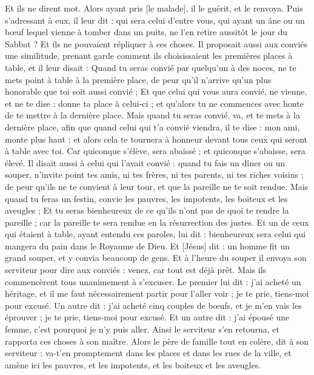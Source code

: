 \begin{multicols}{2}
Et ils ne dirent mot. Alors ayant pris [le malade], il le guérit, et le renvoya.
Puis s'adressant à eux, il leur dit : qui sera celui d'entre vous, qui ayant un âne ou un bœuf lequel vienne à tomber dans un puits, ne l'en retire aussitôt le jour du Sabbat ?
Et ils ne pouvaient répliquer à ces choses.
Il proposait aussi aux conviés une similitude, prenant garde comment ils choisissaient les premières places à table, et il leur disait :
Quand tu seras convié par quelqu'un à des noces, ne te mets point à table à la première place, de peur qu'il n'arrive qu'un plus honorable que toi soit aussi convié ;
Et que celui qui vous aura convié, ne vienne, et ne te dise : donne ta place à celui-ci ; et qu'alors tu ne commences avec honte de te mettre à la dernière place.
Mais quand tu seras convié, va, et te mets à la dernière place, afin que quand celui qui t'a convié viendra, il te dise : mon ami, monte plus haut ; et alors cela te tournera à honneur devant tous ceux qui seront à table avec toi.
Car quiconque s'élève, sera abaissé ; et quiconque s'abaisse, sera élevé.
Il disait aussi à celui qui l'avait convié : quand tu fais un dîner ou un souper, n'invite point tes amis, ni tes frères, ni tes parents, ni tes riches voisins ; de peur qu'ils ne te convient à leur tour, et que la pareille ne te soit rendue.
Mais quand tu feras un festin, convie les pauvres, les impotents, les boiteux et les aveugles ;
Et tu seras bienheureux de ce qu'ils n'ont pas de quoi te rendre la pareille ; car la pareille te sera rendue en la résurrection des justes.
Et un de ceux qui étaient à table, ayant entendu ces paroles, lui dit : bienheureux sera celui qui mangera du pain dans le Royaume de Dieu.
Et [Jésus] dit : un homme fit un grand souper, et y convia beaucoup de gens.
Et à l'heure du souper il envoya son serviteur pour dire aux conviés : venez, car tout est déjà prêt.
Mais ils commencèrent tous unanimement à s'excuser. Le premier lui dit : j'ai acheté un héritage, et il me faut nécessairement partir pour l'aller voir ; je te prie, tiens-moi pour excusé.
Un autre dit : j'ai acheté cinq couples de bœufs, et je m'en vais les éprouver ; je te prie, tiens-moi pour excusé.
Et un autre dit : j'ai épousé une femme, c'est pourquoi je n'y puis aller.
Ainsi le serviteur s'en retourna, et rapporta ces choses à son maître. Alors le père de famille tout en colère, dit à son serviteur : va-t'en promptement dans les places et dans les rues de la ville, et amène ici les pauvres, et les impotents, et les boiteux et les aveugles.

\end{multicols}
